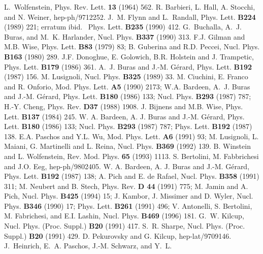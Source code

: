 \begin{thebibliography}{999}
{ L.~Wolfenstein},
 { Phys. Rev. Lett.} {\bf 13} (1964) 562.
R. Barbieri, L. Hall, A. Stocchi, and  N. Weiner, hep-ph/9712252.
{ J.~M. Flynn} and { L.~Randall},
{ Phys. Lett.} {\bf B224} (1989) 221; erratum ibid.\ { Phys.
  Lett.} {\bf B235} (1990) 412.
{ G.~Buchalla}, { A.~J. Buras}, and { M.~K. Harlander},
{ Nucl. Phys.} {\bf B337} (1990) 313.
{ F.J. Gilman and M.B. Wise,} { Phys. Lett.} {\bf B83} (1979) 83;
{ B. Guberina and R.D. Peccei,} { Nucl. Phys.} {\bf B163} (1980) 289.
{ J.F. Donoghue, E. Golowich, B.R. Holstein and J. Trampetic,}
{ Phys. Lett.} {\bf B179} (1986) 361. 
{ A.~J. Buras} and { J.-M. G{\'e}rard},
{ Phys. Lett.} {\bf B192} (1987) 156.
{ M. Lusignoli,} { Nucl. Phys.} {\bf B325} (1989) 33. 
M. Ciuchini, E. Franco and R. Onforio,
{ Mod. Phys. Lett.} {\bf A5} (1990) 2173;
W.A. Bardeen,  A.~J. Buras and  J.-M. G{\'e}rard,
{ Phys. Lett.} {\bf B180} (1986) 133;
{ Nucl. Phys.} {\bf B293} (1987) 787;
H.-Y. Cheng, { Phys. Rev.} {\bf D37} (1988) 1908.
{ J. Bijnens and M.B. Wise,} { Phys. Lett.} {\bf B137} (1984) 245.
{ W. A. Bardeen}, { A. J. Buras} and { J.-M. G{\'e}rard},
 { Phys. Lett.} {\bf B180} (1986) 133;
{ Nucl. Phys.} {\bf B293} (1987) 787;
{ Phys. Lett.} {\bf B192} (1987) 138.
{ E.A. Paschos and Y.L. Wu,} { Mod. Phys. Lett.} {\bf A6} (1991) 93;
{ M. Lusignoli, L. Maiani, G. Martinelli and L. Reina,} 
{ Nucl. Phys.} {\bf B369} (1992) 139.
{ B. Winstein and L. Wolfenstein,} { Rev. Mod. Phys.} {\bf 65} (1993)
1113.
S. Bertolini, M. Fabbrichesi and J.O. Eeg, hep-ph/9802405.
{ W. A. Bardeen}, { A. J. Buras} and { J.-M. G{\'e}rard},
{ Phys. Lett.} {\bf B192} (1987) 138;
{ A. Pich and E. de Rafael}, { Nucl. Phys.} {\bf B358} (1991) 311;
{ M. Neubert and B. Stech}, { Phys. Rev.} {\bf D 44} (1991) 775;
{ M. Jamin and A. Pich}, { Nucl. Phys.} {\bf B425} (1994) 15; 
{ J. Kambor, J. Missimer and D. Wyler},
{ Nucl. Phys.} {\bf B346} (1990) 17;
{ Phys. Lett.} {\bf B261} (1991) 496;
{ V. Antonelli, S. Bertolini, M. Fabrichesi, and E.I. Lashin},
{ Nucl. Phys.} {\bf B469} (1996) 181.
{ G.~W. Kilcup},
 { Nucl. Phys. (Proc. Suppl.)} {\bf B20} (1991) 417.
{ S.~R. Sharpe},
 { Nucl. Phys. (Proc. Suppl.)} {\bf B20} (1991) 429.
D. Pekurovsky and G. Kilcup, hep-lat/9709146.
{ J.~Heinrich}, { E.~A. Paschos}, { J.-M. Schwarz}, and { Y.~L.
}
\end{thebibliography}
